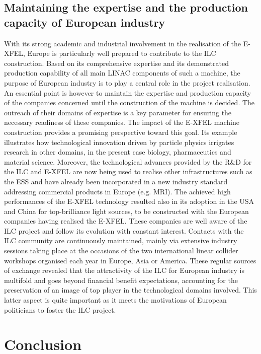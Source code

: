 \documentclass[%
 reprint,
 amsmath,amssymb,
 aps,
]{revtex4-1}
\begin{document}
\subsection{\label{sec:discussionInd}Maintaining the expertise and the production capacity of European industry}

With its strong academic and industrial involvement in the realisation of the E-XFEL, Europe is
particularly well prepared to contribute to the ILC construction. Based on its comprehensive expertise
and its demonstrated production capability of all main LINAC components of such a machine, the
purpose of European industry is to play a central role in the project realisation. An essential point
is however to maintain the expertise and production capacity of the companies concerned until the
construction of the machine is decided.
The outreach of their domains of expertise is a key parameter for ensuring the necessary readiness
of these companies. The impact of the E-XFEL machine construction provides a promising perspective
toward this goal. Its example illustrates how technological innovation driven by particle physics irrigates
research in other domains, in the present case biology, pharmaceutics and material science. Moreover,
the technological advances provided by the R\&D for the ILC and E-XFEL are now being used to realise
other infrastructures such as the ESS and have already been incorporated in a new industry standard
addressing commercial products in Europe (e.g. MRI). The achieved high performances of the E-XFEL
technology resulted also in its adoption in the USA and China for top-brilliance light sources, to be
constructed with the European companies having realised the E-XFEL.
These companies are well aware of the ILC project and follow its evolution with constant interest.
Contacts with the ILC community are continuously maintained, mainly via extensive industry sessions
taking place at the occasions of the two international linear collider workshops organised each year in
Europe, Asia or America. These regular sources of exchange revealed that the attractivity of the ILC
for European industry is multifold and goes beyond financial benefit expectations, accounting for the
preservation of an image of top player in the technological domains involved. This latter aspect is quite
important as it meets the motivations of European politicians to foster the ILC project.

\section{Conclusion}



\end{document}
